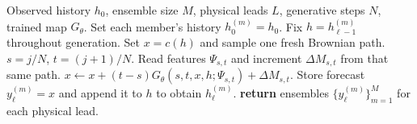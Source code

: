 \begin{algorithm}[t]
\caption{Map Steps Within an Autoregressive Forecast}
\label{alg:forecast}
\begin{algorithmic}[1]
\REQUIRE Observed history $h_0$, ensemble size $M$, physical leads $L$, generative steps $N$, trained map $G_\theta$.
\STATE Set each member's history $h_0^{(m)}=h_0$.
    \STATE Fix $h=h_{\ell-1}^{(m)}$ throughout generation.
    \STATE Set $x=c(h)$ and sample one fresh Brownian path.
      \STATE $s=j/N$, $t=(j+1)/N$.
      \STATE Read features $\Psi_{s,t}$ and increment $\Delta M_{s,t}$ from that same path.
      \STATE $x\gets x+(t-s)G_\theta(s,t,x,h;\Psi_{s,t})+\Delta M_{s,t}$.
    \ENDFOR
    \STATE Store forecast $y_\ell^{(m)}=x$ and append it to $h$ to obtain $h_\ell^{(m)}$.
  \ENDFOR
\ENDFOR
\STATE \textbf{return} ensembles $\{y_\ell^{(m)}\}_{m=1}^M$ for each physical lead.
\end{algorithmic}
\end{algorithm}
